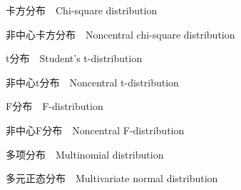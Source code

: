 \begin{frame}{卡方分布$\quad$Chi-square distribution}

\end{frame}

\begin{frame}{非中心卡方分布$\quad$Noncentral chi-square distribution}

\end{frame}

\begin{frame}{t分布$\quad$Student's t-distribution}

\end{frame}

\begin{frame}{非中心t分布$\quad$Noncentral t-distribution}

\end{frame}

\begin{frame}{F分布$\quad$F-distribution}

\end{frame}

\begin{frame}{非中心F分布$\quad$Noncentral F-distribution}

\end{frame}

\begin{frame}{多项分布$\quad$Multinomial distribution}

\end{frame}

\begin{frame}{多元正态分布$\quad$Multivariate normal distribution}

\end{frame}

